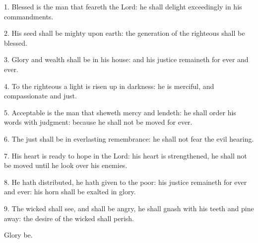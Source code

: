 1. Blessed is the man that feareth the Lord: he shall delight exceedingly in his commandments.

2. His seed shall be mighty upon earth: the generation of the righteous shall be blessed.

3. Glory and wealth shall be in his house: and his justice remaineth for ever and ever.

4. To the righteous a light is risen up in darkness: he is merciful, and compassionate and just.

5. Acceptable is the man that sheweth mercy and lendeth: he shall order his words with judgment:
because he shall not be moved for ever.

6. The just shall be in everlasting remembrance: he shall not fear the evil hearing.

7. His heart is ready to hope in the Lord: his heart is strengthened, he shall not be moved until he look over his enemies.

8. He hath distributed, he hath given to the poor: his justice remaineth for ever and ever: his horn shall be exalted in glory.

9. The wicked shall see, and shall be angry, he shall gnash with his teeth and pine away: the desire of the wicked shall perish. 

Glory be.